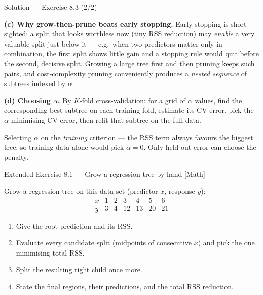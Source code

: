 \documentclass[aspectratio=169,11pt]{beamer}
\begin{document}
\begin{frame}{Solution --- Exercise 8.3 (2/2)}
\begin{solutionbox}
\textbf{(c) Why grow-then-prune beats early stopping.} Early stopping is short-sighted: a split that looks worthless now (tiny RSS reduction) may \emph{enable} a very valuable split just below it --- e.g.\ when two predictors matter only in combination, the first split shows little gain and a stopping rule would quit before the second, decisive split. Growing a large tree first and then pruning keeps such pairs, and cost-complexity pruning conveniently produces a \emph{nested sequence} of subtrees indexed by $\alpha$.

\medskip
\textbf{(d) Choosing $\alpha$.} By $K$-fold cross-validation: for a grid of $\alpha$ values, find the corresponding best subtree on each training fold, estimate its CV error, pick the $\alpha$ minimising CV error, then refit that subtree on the full data.
\end{solutionbox}
\begin{mistake}
Selecting $\alpha$ on the \emph{training} criterion --- the RSS term always favours the biggest tree, so training data alone would pick $\alpha=0$. Only held-out error can choose the penalty.
\end{mistake}
\end{frame}

\begin{frame}{Extended Exercise 8.1 --- Grow a regression tree by hand [Math]}
\begin{longexercise}
Grow a regression tree on this data set (predictor $x$, response $y$):
\[
\begin{array}{c|cccccc}
x & 1 & 2 & 3 & 4 & 5 & 6\\\hline
y & 3 & 4 & 12 & 13 & 20 & 21
\end{array}
\]
\begin{enumerate}
  \item Give the root prediction and its RSS.
  \item Evaluate every candidate split (midpoints of consecutive $x$) and pick the one minimising total RSS.
  \item Split the resulting right child once more.
  \item State the final regions, their predictions, and the total RSS reduction.
\end{enumerate}
\end{longexercise}
\end{frame}
\end{document}
